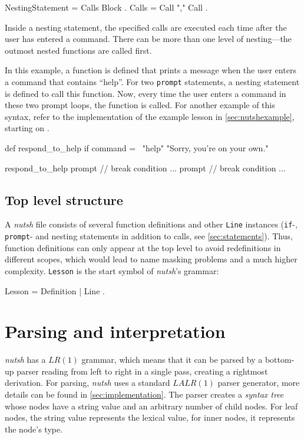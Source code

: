 \documentclass[paper=a4,twoside,abstract=on,cleardoublepage=empty,numbers=noenddot,toc=bib,12pt,appendixprefix=true]{scrreprt}
\begin{document}
\begin{ebnf}
NestingStatement = Calls Block .
Calls = Call { "," Call } .
\end{ebnf}
%
Inside a nesting statement, the specified calls are executed each time after the user has entered a command. There can be more than one level of nesting---the outmost nested functions are called first.

In this example, a function is defined that prints a message when the user enters a command that contains “help”. For two \texttt{prompt} statements, a nesting statement is defined to call this function. Now, every time the user enters a command in these two prompt loops, the function is called. For another example of this syntax, refer to the implementation of the example lesson in \cref{sec:nutshexample}, starting on .

\begin{nutsh}
def respond_to_help {
    if command =~ "help" {
        "Sorry, you're on your own."
    }
}

respond_to_help {
    prompt {
        // break condition ...
    }
    prompt {
        // break condition ...
    }
}
\end{nutsh}

\subsection{Top level structure}

A \emph{nutsh} file consists of several function definitions and other \texttt{Line} instances (\texttt{if}-, \texttt{prompt}- and nesting statements in addition to calls, see \cref{sec:statements}). Thus, function definitions can only appear at the top level to avoid redefinitions in different scopes, which would lead to name masking problems and a much higher complexity. \texttt{Lesson} is the start symbol of \emph{nutsh}'s grammar:

\begin{ebnf}
Lesson = { Definition | Line } .
\end{ebnf}

\section{Parsing and interpretation}

\emph{nutsh} has a $LR(1)$ grammar, which means that it can be parsed by a bottom-up parser reading from left to right in a single pass, creating a rightmost derivation. For parsing, \emph{nutsh} uses a standard $LALR(1)$ parser generator, more details can be found in \cref{sec:implementation}.
The parser creates a \emph{syntax tree} whose nodes have a string value and an arbitrary number of child nodes. For leaf nodes, the string value represents the lexical value, for inner nodes, it represents the node's type.
\end{document}
